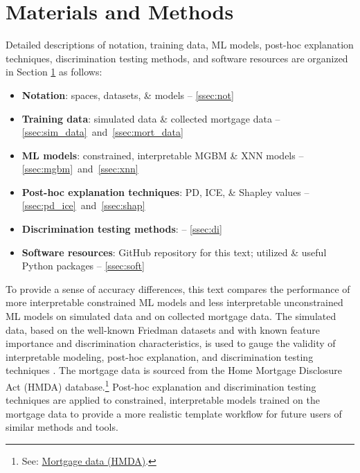 \documentclass[information,article,submit,moreauthors,pdftex]{definitions/mdpi}
\begin{document}
\section{Materials and Methods}\label{sec:m_and_m}

Detailed descriptions of notation, training data, ML models, post-hoc explanation techniques, discrimination testing methods, and software resources are organized in Section \ref{sec:m_and_m} as follows:

\begin{itemize}[leftmargin=*,labelsep=5.8mm]
	\item \textbf{Notation}: spaces, datasets, \& models -- \textsection\ref{ssec:not}
	\item \textbf{Training data}: simulated data \& collected mortgage data -- \textsection\ref{ssec:sim_data}~and~\textsection\ref{ssec:mort_data}
	\item \textbf{ML models}: constrained, interpretable MGBM \& XNN models  -- \textsection\ref{ssec:mgbm}~and~\textsection\ref{ssec:xnn}
	\item \textbf{Post-hoc explanation techniques}: PD, ICE, \& Shapley values -- \textsection\ref{ssec:pd_ice}~and~\textsection\ref{ssec:shap}
	\item \textbf{Discrimination testing methods}: -- \textsection\ref{ssec:di}
	\item \textbf{Software resources}: GitHub repository for this text; utilized \& useful Python packages -- \textsection\ref{ssec:soft}
\end{itemize}

To provide a sense of accuracy differences, this text compares the performance of more interpretable constrained ML models and less interpretable unconstrained ML models on simulated data and on collected mortgage data. The simulated data, based on the well-known Friedman datasets and with known feature importance and discrimination characteristics, is used to gauge the validity of interpretable modeling, post-hoc explanation, and discrimination testing techniques \cite{friedman1991multivariate}. The mortgage data is sourced from the Home Mortgage Disclosure Act (HMDA) database.\footnote{See: \href{https://www.consumerfinance.gov/data-research/hmda/}{Mortgage data (HMDA)}.} Post-hoc explanation and discrimination testing techniques are applied to constrained, interpretable models trained on the mortgage data to provide a more realistic template workflow for future users of similar methods and tools. 
\end{document}
